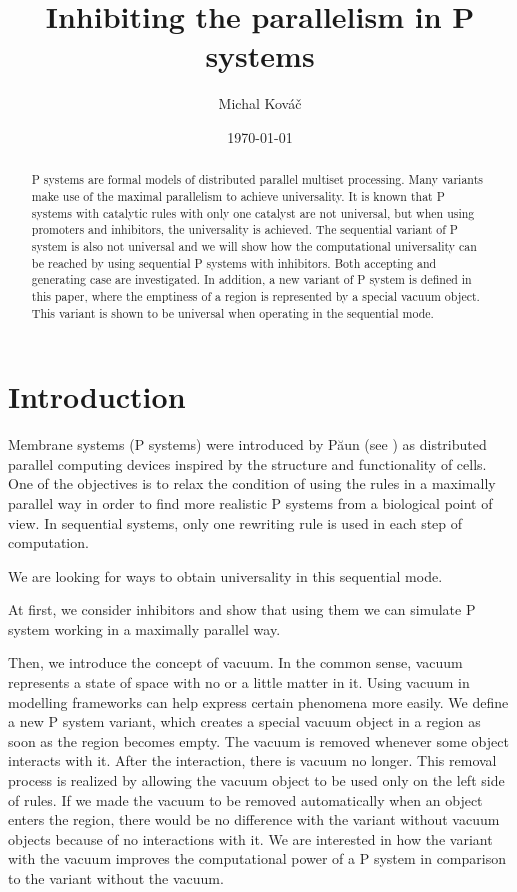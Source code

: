 \documentclass[a4paper,10pt]{article}
\begin{document}
\title{Inhibiting the parallelism in P systems}
\author{Michal Kováč}
\date{\today}
\maketitle

\begin{abstract}
P systems are formal models of distributed parallel multiset processing. Many variants make use of the maximal parallelism to achieve universality.
It is known that P systems with catalytic rules with only one catalyst are not universal, but when using promoters and inhibitors, the universality is achieved.
The sequential variant of P system is also not universal and we will show how the computational universality can be reached by using sequential P systems with inhibitors. Both accepting and generating case are investigated.
In addition, a new variant of P system is defined in this paper, where the emptiness of a region is represented by a special vacuum object. This variant is shown to be universal when operating in the sequential mode.
\end{abstract}

\section{Introduction}
\label{sec:introduction}


Membrane systems (P systems) were introduced by P\u{a}un (see \cite{Paun2000108}) as distributed parallel computing devices inspired by the structure and functionality of cells.
One of the objectives is to relax the condition of using the rules in a maximally parallel way in order to find more realistic P systems from a biological point of view.
In sequential systems, only one rewriting rule is used in each step of computation.


We are looking for ways to obtain universality in this sequential mode.


At first, we consider inhibitors and show that using them we can simulate P system working in a maximally parallel way.


Then, we introduce the concept of vacuum. In the common sense, vacuum represents a state of space with no or a little matter in it. Using vacuum in modelling frameworks can help express certain phenomena more easily.
We define a new P system variant, which creates a special vacuum object in a region as soon as the region becomes empty. The vacuum is removed whenever some object interacts with it. After the interaction, there is vacuum no longer. This removal process is realized by allowing the vacuum object to be used only on the left side of rules.
If we made the vacuum to be removed automatically when an object enters the region, there would be no difference with the variant without vacuum objects because of no interactions with it.
We are interested in how the variant with the vacuum improves the computational power of a P system in comparison to the variant without the vacuum.
\end{document}
